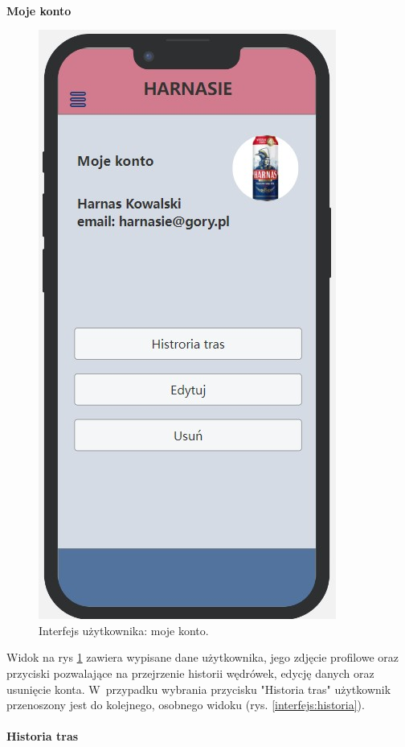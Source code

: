     \\
    \textbf{Moje konto} 
    \begin{figure}[H]
        \centering
        \includegraphics[scale=0.5]{img/interfejsy/if_konto.jpg}
        \caption{Interfejs użytkownika: moje konto.}
        \label{interfejs:konto}
    \end{figure}
    Widok na rys \ref{interfejs:konto} zawiera wypisane dane użytkownika, jego zdjęcie profilowe oraz przyciski pozwalające na przejrzenie historii wędrówek, edycję danych oraz usunięcie konta. W~przypadku wybrania przycisku "Historia tras" użytkownik przenoszony jest do kolejnego, osobnego widoku (rys. \ref{interfejs:historia}). \\
    \\
    \textbf{Historia tras}
